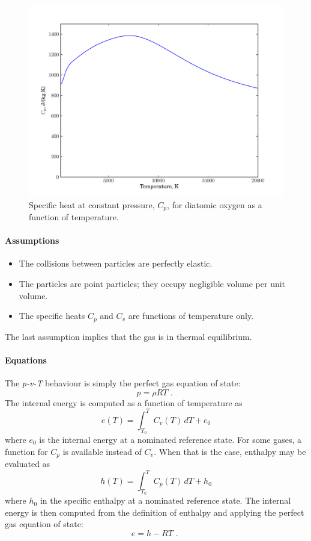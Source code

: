 \begin{figure}[h]
\centering
\includegraphics[width=12cm]{../figs/Cp-O2}
\caption[$C_p$ for diatomic oxygen]{Specific heat at constant pressure, $C_p$, for diatomic oxygen as a function of temperature.}
\label{fig:Cp-O2}
\end{figure}

\paragraph{Assumptions}
\begin{itemize}
\item The collisions between particles are perfectly elastic.
\item The particles are point particles; they occupy negligible volume per unit volume.
\item The specific heats $C_p$ and $C_v$ are functions of temperature only.
\end{itemize}
The last assumption implies that the gas is in thermal equilibrium.

\paragraph{Equations}
The \textit{p-v-T} behaviour is simply the perfect gas equation of state:
\begin{equation}
 p = \rho R T \text{ . }
\end{equation}
The internal energy is computed as a function of temperature as
\begin{equation}
 e(T) = \int_{T_0}^{T} C_v(T)\,dT + e_0
\end{equation}
where $e_0$ is the internal energy at a nominated reference state.
For some gases, a function for $C_p$ is available instead of $C_v$.
When that is the case, enthalpy may be evaluated as
\begin{equation}
\label{eq:tpg_h}
 h(T) = \int_{T_0}^{T} C_p(T)\,dT + h_0
\end{equation}
where $h_0$ in the specific enthalpy at a nominated reference state.
The internal energy is then computed from the definition of enthalpy
and applying the perfect gas equation of state:
\begin{equation}
 e = h - RT \text{ . }
\end{equation}

